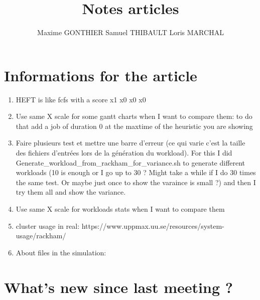 \documentclass[a4paper]{article}
\title{Notes articles}
\author{Maxime GONTHIER Samuel THIBAULT Loris MARCHAL}
\begin{document}
\newpage


\section{Informations for the article}
	\begin{enumerate}
		\item HEFT is like fcfs with a score x1 x0 x0 x0
		\item Use same X scale for some gantt charts when I want to compare them: to do that add a job of duration 0 at the maxtime of the heuristic you are showing
		\item Faire plusieurs test et mettre une barre d'erreur (ce qui varie c'est la taille des fichiers d'entrées lors de la génération du workload). For this I did Generate\_workload\_from\_rackham\_for\_variance.sh to generate different workloads (10 is enough or I go up to 30 ? Might take a while if I do 30 times the same test. Or maybe just once to show the varaince is small ?) and then I try them all and show the variance.
		\item Use same X scale for workloads stats when I want to compare them
		\item cluster usage in real: https://www.uppmax.uu.se/resources/system-usage/rackham/
		\item About files in the simulation: %
	 \end{enumerate}

\section{What's new since last meeting ?}
\end{document}
